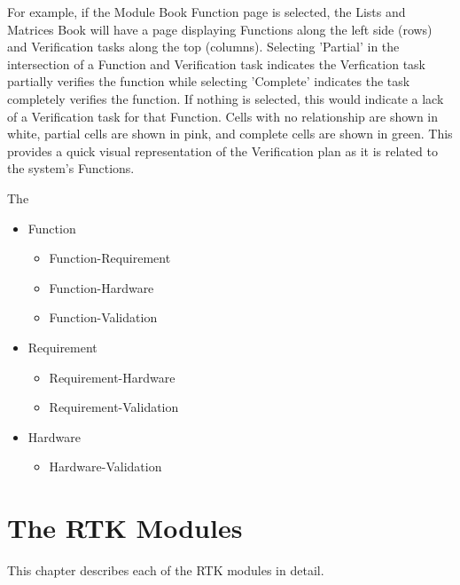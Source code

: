 \documentclass[twoside,12pt,letterpaper,openright]{book}
\begin{document}
\noindent For example, if the Module Book Function page is selected, the Lists
and Matrices Book will have a page displaying Functions along the left side 
(rows) and Verification tasks along the top (columns).  Selecting 'Partial' in 
the intersection of a Function and Verification task indicates the Verfication 
task partially verifies the function while selecting 'Complete' indicates the
task completely verifies the function.  If nothing is selected, this would 
indicate a lack of a Verification task for that Function.  Cells with no 
relationship are shown in white, partial cells are shown in pink, and complete 
cells are shown in green.  This provides a quick visual representation of the 
Verification plan as it is related to the system's Functions.

\noindent The 

\begin{itemize}
    \item Function
        \begin{itemize}
            \item Function-Requirement
            \item Function-Hardware
            \item Function-Validation
        \end{itemize}
    \item Requirement
        \begin{itemize}
            \item Requirement-Hardware
            \item Requirement-Validation
        \end{itemize}
    \item Hardware
        \begin{itemize}
            \item Hardware-Validation
        \end{itemize}
\end{itemize}


\chapter{The RTK Modules}

\noindent This chapter describes each of the RTK modules in detail.
\end{document}
